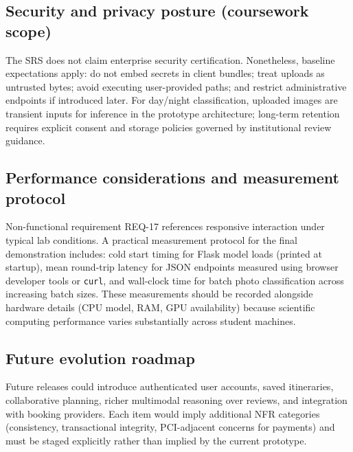 \documentclass[12pt,oneside,openany]{report}
\begin{document}
\subsection{Security and privacy posture (coursework scope)}
The SRS does not claim enterprise security certification. Nonetheless, baseline expectations apply: do not embed secrets in client bundles; treat uploads as untrusted bytes; avoid executing user-provided paths; and restrict administrative endpoints if introduced later. For day/night classification, uploaded images are transient inputs for inference in the prototype architecture; long-term retention requires explicit consent and storage policies governed by institutional review guidance.

\subsection{Performance considerations and measurement protocol}
Non-functional requirement REQ-17 references responsive interaction under typical lab conditions. A practical measurement protocol for the final demonstration includes: cold start timing for Flask model loads (printed at startup), mean round-trip latency for JSON endpoints measured using browser developer tools or \texttt{curl}, and wall-clock time for batch photo classification across increasing batch sizes. These measurements should be recorded alongside hardware details (CPU model, RAM, GPU availability) because scientific computing performance varies substantially across student machines.

\subsection{Future evolution roadmap}
Future releases could introduce authenticated user accounts, saved itineraries, collaborative planning, richer multimodal reasoning over reviews, and integration with booking providers. Each item would imply additional NFR categories (consistency, transactional integrity, PCI-adjacent concerns for payments) and must be staged explicitly rather than implied by the current prototype.
\end{document}
